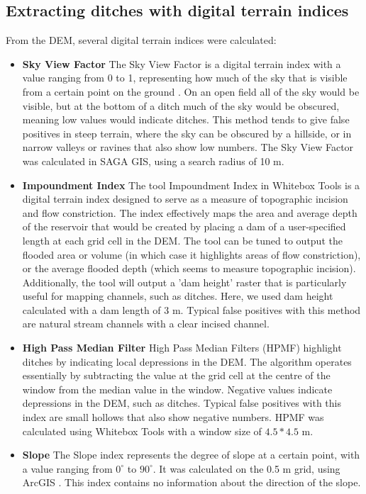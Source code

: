 \documentclass[]{interact}
\theoremstyle{plain}%
\theoremstyle{definition}
\theoremstyle{remark}
\begin{document}
\subsection{Extracting ditches with digital terrain indices}
From the DEM, several digital terrain indices were calculated:
\begin{itemize} \label{data_attributes}

  \item \textbf{Sky View Factor} \newline
  The Sky View Factor is a digital terrain index with a value ranging from 0 to 1, representing how much of the sky that is visible from a certain point on the ground \citep{zaksek}. On an open field all of the sky would be visible, but at the bottom of a ditch much of the sky would be obscured, meaning low values would indicate ditches. This method tends to give false positives in steep terrain, where the sky can be obscured by a hillside, or in narrow valleys or ravines that also show low numbers. The Sky View Factor was calculated in SAGA GIS, using a search radius of 10 m.

  \item \textbf{Impoundment Index}\newline
  The tool Impoundment Index in Whitebox Tools \citep{whiteboxtools} is a digital terrain index designed to serve as a measure of topographic incision and flow constriction. The index effectively maps the area and average depth of the reservoir that would be created by placing a dam of a user-specified length at each grid cell in the DEM. The tool can be tuned to output the flooded area or volume (in which case it highlights areas of flow constriction), or the average flooded depth (which seems to measure topographic incision). Additionally, the tool will output a 'dam height' raster that is particularly useful for mapping channels, such as ditches. Here, we used dam height calculated with a dam length of 3 m. Typical false positives with this method are natural stream channels with a clear incised channel.
  
  \item \textbf{High Pass Median Filter} \newline
  High Pass Median Filters (HPMF) highlight ditches by indicating local depressions in the DEM. The algorithm operates essentially by subtracting the value at the grid cell at the centre of the window from the median value in the window. Negative values indicate depressions in the DEM, such as ditches. Typical false positives with this index are small hollows that also show negative numbers. HPMF was calculated using Whitebox Tools \citep{whiteboxtools} with a window size of $4.5 * 4.5$ m. 

    \item \textbf{Slope} \newline
    The Slope index represents the degree of slope at a certain point, with a value ranging from $0^{\circ}$ to $90^{\circ}$. It was calculated on the 0.5 m grid, using ArcGIS \citep{EsriArcGisBook}. This index contains no information about the direction of the slope.
\end{itemize}
\end{document}
